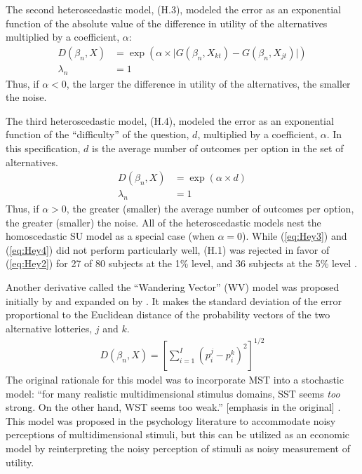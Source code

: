 \documentclass[11pt,a4paper]{article}
\begin{document}
The second heteroscedastic model, (H.3), modeled the error as an exponential function of the absolute value of the difference in utility of the alternatives multiplied by a coefficient, $\alpha$:
\begin{align*}
	\tag{H.3}
	\label{eq:Hey3}
	D(\beta_n,X) &= \exp\left(\alpha \times \lvert G(\beta_n,X_{kt}) - G(\beta_n,X_{jt}) \rvert\right)\\
	\lambda_n &= 1
\end{align*}
Thus, if $\alpha < 0$, the larger the difference in utility of the alternatives, the smaller the noise.

The third heteroscedastic model, (H.4), modeled the error as an exponential function of the \enquote{difficulty} of the question, $d$, multiplied by a coefficient, $\alpha$.
In this specification, $d$ is the average number of outcomes per option in the set of alternatives.
\begin{align*}
	\tag{H.4}
	\label{eq:Hey4}
	D(\beta_n,X) &= \exp(\alpha \times d)\\
	\lambda_n &= 1
\end{align*}
Thus, if $\alpha > 0$, the greater (smaller) the average number of outcomes per option, the greater (smaller) the noise.
All of the heteroscedastic models nest the homoscedastic SU model as a special case (when $\alpha=0$).
While (\ref{eq:Hey3}) and (\ref{eq:Hey4}) did not perform particularly well, (H.1) was rejected in favor of (\ref{eq:Hey2}) for 27 of 80 subjects at the 1\% level, and 36 subjects at the 5\% level \parencite*[639]{Hey1995a}.

Another derivative called the \enquote{Wandering Vector} (WV) model was proposed initially by \textcite{Carroll1980} and expanded on by \textcite{Carroll1991}.
It makes the standard deviation of the error proportional to the Euclidean distance of the probability vectors of the two alternative lotteries, $j$ and $k$.
\begin{align*}
	D(\beta_n,X) = \left[  \sum_{i=1}^I (p_i^j - p_i^k)^2 \right]^{1/2}
\end{align*}
The original rationale for this model was to incorporate MST into a stochastic model: \enquote{for many realistic multidimensional stimulus domains, SST seems \textit{too} strong.
On the other hand, WST seems too weak.} [emphasis in the original] \parencite*[343]{Carroll1991}.
This model was proposed in the psychology literature to accommodate noisy perceptions of multidimensional stimuli, but this can be utilized as an economic model by reinterpreting the noisy perception of stimuli as noisy measurement of utility.
\end{document}

